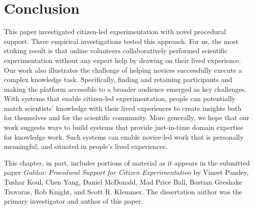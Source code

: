 \section{Conclusion}
This paper investigated citizen-led experimentation with novel procedural support. Three empirical investigations tested this approach. For us, the most striking result is that online volunteers collaboratively performed scientific experimentation without any expert help by drawing on their lived experience. Our work also illustrates the challenge of helping novices successfully execute a complex knowledge task. Specifically, finding and retaining participants and making the platform accessible to a broader audience emerged as key challenges. With systems that enable citizen-led experimentation, people can potentially match scientists' knowledge with their lived experiences to create insights both for themselves and for the scientific community. More generally, we hope that our work suggests ways to build systems that provide just-in-time domain expertise for knowledge work. Such systems can enable novice-led work that is personally meaningful, and situated in people's lived experiences.

This chapter, in part, includes portions of material as it appears in  the submitted paper \emph{Galileo: Procedural Support for Citizen Experimentation} by Vineet Pandey, Tushar Koul, Chen Yang, Daniel McDonald, Mad Price Ball, Bastian Greshake Tzovaras, Rob Knight, and Scott R. Klemmer. The dissertation author was the primary investigator and author of this paper.

